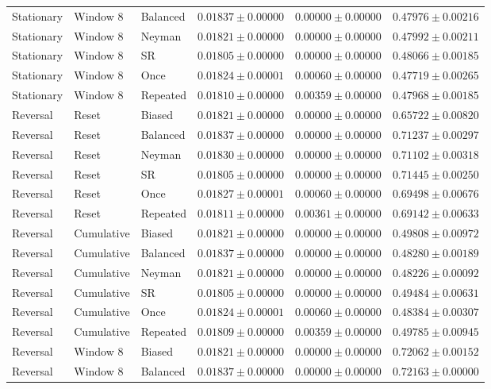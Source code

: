 \begin{longtable}{@{}llllll@{}}
Stationary & Window 8 & Balanced & $0.01837 \pm 0.00000$ & $0.00000 \pm 0.00000$ & $0.47976 \pm 0.00216$ \\
Stationary & Window 8 & Neyman & $0.01821 \pm 0.00000$ & $0.00000 \pm 0.00000$ & $0.47992 \pm 0.00211$ \\
Stationary & Window 8 & SR & $0.01805 \pm 0.00000$ & $0.00000 \pm 0.00000$ & $0.48066 \pm 0.00185$ \\
Stationary & Window 8 & Once & $0.01824 \pm 0.00001$ & $0.00060 \pm 0.00000$ & $0.47719 \pm 0.00265$ \\
Stationary & Window 8 & Repeated & $0.01810 \pm 0.00000$ & $0.00359 \pm 0.00000$ & $0.47968 \pm 0.00185$ \\
Reversal & Reset & Biased & $0.01821 \pm 0.00000$ & $0.00000 \pm 0.00000$ & $0.65722 \pm 0.00820$ \\
Reversal & Reset & Balanced & $0.01837 \pm 0.00000$ & $0.00000 \pm 0.00000$ & $0.71237 \pm 0.00297$ \\
Reversal & Reset & Neyman & $0.01830 \pm 0.00000$ & $0.00000 \pm 0.00000$ & $0.71102 \pm 0.00318$ \\
Reversal & Reset & SR & $0.01805 \pm 0.00000$ & $0.00000 \pm 0.00000$ & $0.71445 \pm 0.00250$ \\
Reversal & Reset & Once & $0.01827 \pm 0.00001$ & $0.00060 \pm 0.00000$ & $0.69498 \pm 0.00676$ \\
Reversal & Reset & Repeated & $0.01811 \pm 0.00000$ & $0.00361 \pm 0.00000$ & $0.69142 \pm 0.00633$ \\
Reversal & Cumulative & Biased & $0.01821 \pm 0.00000$ & $0.00000 \pm 0.00000$ & $0.49808 \pm 0.00972$ \\
Reversal & Cumulative & Balanced & $0.01837 \pm 0.00000$ & $0.00000 \pm 0.00000$ & $0.48280 \pm 0.00189$ \\
Reversal & Cumulative & Neyman & $0.01821 \pm 0.00000$ & $0.00000 \pm 0.00000$ & $0.48226 \pm 0.00092$ \\
Reversal & Cumulative & SR & $0.01805 \pm 0.00000$ & $0.00000 \pm 0.00000$ & $0.49484 \pm 0.00631$ \\
Reversal & Cumulative & Once & $0.01824 \pm 0.00001$ & $0.00060 \pm 0.00000$ & $0.48384 \pm 0.00307$ \\
Reversal & Cumulative & Repeated & $0.01809 \pm 0.00000$ & $0.00359 \pm 0.00000$ & $0.49785 \pm 0.00945$ \\
Reversal & Window 8 & Biased & $0.01821 \pm 0.00000$ & $0.00000 \pm 0.00000$ & $0.72062 \pm 0.00152$ \\
Reversal & Window 8 & Balanced & $0.01837 \pm 0.00000$ & $0.00000 \pm 0.00000$ & $0.72163 \pm 0.00000$ \\

\end{longtable}
